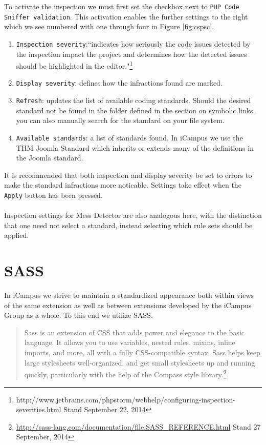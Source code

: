\documentclass[]{report}
\begin{document}
\noindent
To activate the inspection we must first set the checkbox next to \texttt{PHP Code Sniffer validation}. This activation enables the further settings to the right which we see numbered with one through four in Figure \ref{fig:cspsc}.

\begin{enumerate}
	\item \texttt{Inspection severity}:``indicates how seriously the code issues detected by the inspection impact the project and determines how the detected issues should be highlighted in the editor."\footnote{http://www.jetbrains.com/phpstorm/webhelp/configuring-inspection-severities.html Stand September 22, 2014}
	\item \texttt{Display severity}: defines how the infractions found are marked.
	\item \texttt{Refresh}: updates the list of available coding standards. Should the desired standard not be found in the folder defined in the section on symbolic links, you can also manually search for the standard on your file system.
	\item \texttt{Available standards}: a list of standards found. In iCampus we use the THM Joomla Standard which inherits or extends many of the definitions in the Joomla standard.
\end{enumerate}

\noindent
It is recommended that both inspection and display severity be set to errors to make the standard infractions more noticable. Settings take effect when the \texttt{Apply} button has been pressed.\\
\\
Inspection settings for Mess Detector are also analogous here, with the distinction that one need not select a standard, instead selecting which rule sets should be applied.

\newpage
\section{SASS}

In iCampus we strive to maintain a standardized appearance both within views of the same extension as well as between extensions developed by the iCampus Group as a whole. To this end we utilize SASS.

\begin{quote}
	Sass is an extension of CSS that adds power and elegance to the basic language. It allows you to use variables, nested rules, mixins, inline imports, and more, all with a fully CSS-compatible syntax. Sass helps keep large stylesheets well-organized, and get small stylesheets up and running quickly, particularly with the help of the Compass style library.\footnote{\url{http://sass-lang.com/documentation/file.SASS_REFERENCE.html} Stand 27 September, 2014}
\end{quote}
\end{document}
